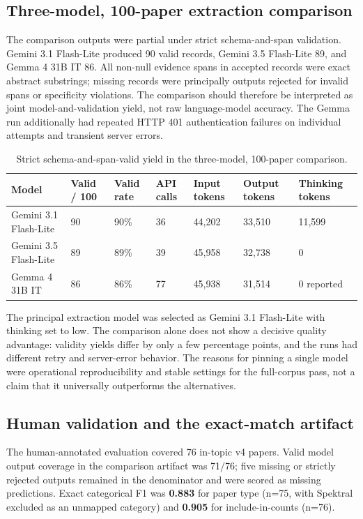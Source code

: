 \documentclass[sigconf,review,anonymous]{acmart}
\begin{document}
\subsection{Three-model, 100-paper extraction comparison}
The comparison outputs were partial under strict schema-and-span validation. Gemini 3.1 Flash-Lite produced 90 valid records, Gemini 3.5 Flash-Lite 89, and Gemma 4 31B IT 86. All non-null evidence spans in accepted records were exact abstract substrings; missing records were principally outputs rejected for invalid spans or specificity violations. The comparison should therefore be interpreted as joint model-and-validation yield, not raw language-model accuracy. The Gemma run additionally had repeated HTTP 401 authentication failures on individual attempts and transient server errors.

\begin{table}[t]
\centering
\scriptsize
\setlength{\tabcolsep}{3pt}
\begin{tabularx}{\textwidth}{>{\raggedright\arraybackslash}XYYYYYY}
\toprule
Model & Valid / 100 & Valid rate & API calls & Input tokens & Output tokens & Thinking tokens \\
\midrule
Gemini 3.1 Flash-Lite & 90 & 90\% & 36 & 44,202 & 33,510 & 11,599 \\
Gemini 3.5 Flash-Lite & 89 & 89\% & 39 & 45,958 & 32,738 & 0 \\
Gemma 4 31B IT & 86 & 86\% & 77 & 45,938 & 31,514 & 0 reported \\
\bottomrule
\end{tabularx}
\caption{Strict schema-and-span-valid yield in the three-model, 100-paper comparison.}
\end{table}

The principal extraction model was selected as Gemini 3.1 Flash-Lite with thinking set to low. The comparison alone does not show a decisive quality advantage: validity yields differ by only a few percentage points, and the runs had different retry and server-error behavior. The reasons for pinning a single model were operational reproducibility and stable settings for the full-corpus pass, not a claim that it universally outperforms the alternatives.

\subsection{Human validation and the exact-match artifact}
The human-annotated evaluation covered 76 in-topic v4 papers. Valid model output coverage in the comparison artifact was 71/76; five missing or strictly rejected outputs remained in the denominator and were scored as missing predictions. Exact categorical F1 was \textbf{0.883} for paper type (n=75, with Spektral excluded as an unmapped category) and \textbf{0.905} for include-in-counts (n=76).
\end{document}
